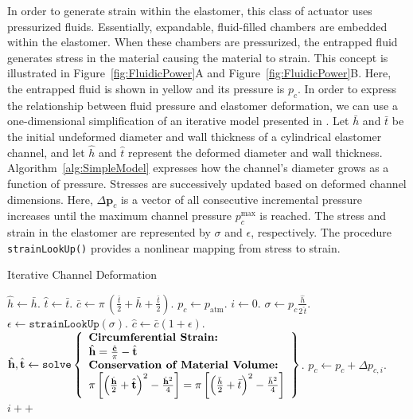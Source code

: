 In order to generate strain within the elastomer, this class of actuator uses pressurized fluids.
Essentially, expandable, fluid-filled chambers are embedded within the elastomer.
When these chambers are pressurized, the entrapped fluid generates stress in the material causing the material to strain.
This concept is illustrated in Figure~\ref{fig:FluidicPower}A and Figure~\ref{fig:FluidicPower}B.
Here, the entrapped fluid is shown in yellow and its pressure is $p_c$.
In order to express the relationship between fluid pressure and elastomer deformation, we can use a one-dimensional simplification of an iterative model presented in \citet{marchese2015design}.
Let $\bar{h}$ and $\bar{t}$ be the initial undeformed diameter and wall thickness of a cylindrical elastomer channel, and let $\hat{h}$ and $\hat{t}$ represent the deformed diameter and wall thickness.
Algorithm~\ref{alg:SimpleModel} expresses how the channel's diameter grows as a function of pressure.
Stresses are successively updated based on deformed channel dimensions.
Here, $\Delta \mathbf{p}_{c}$ is a vector of all consecutive incremental pressure increases until the maximum channel pressure $p_c^{\text{max}}$ is reached.
The stress and strain in the elastomer are represented by $\sigma$ and $\epsilon$, respectively.
The procedure \texttt{strainLookUp()} provides a nonlinear mapping from stress to strain.
\begin{algorithm}[htb]
\footnotesize
  \DontPrintSemicolon
  \SetAlgoLined
  \caption{Iterative Channel Deformation}
  \label{alg:SimpleModel}
  $\hat{h} \gets \bar{h}$. \;
  $\hat{t} \gets \bar{t}$. \;
  $\bar{c} \gets \pi \, \left(\frac{\bar{t}}{2} + \bar{h} + \frac{\bar{t}}{2}\right)$. \;
  $p_c \gets p_{\text{atm}}$. \;
  $i \gets 0$. \;
  {
     $\sigma \gets p_c \frac{\hat{h}}{2 \,\hat{t}}$. \;
     $\epsilon \gets \texttt{strainLookUp}(\sigma)$. \;
     $\hat{c} \gets \bar{c}\left( 1 + \epsilon \right)$. \;
     $\hat{h}, \hat{t} \gets \texttt{solve}\left\{
	\begin{array}{l}
       \text{\textbf{Circumferential Strain:}} \\
       \hat{h} = \frac{\hat{c}}{\pi} - \hat{t} \\
       \text{\textbf{Conservation of Material Volume:}} \\
       \pi \left[ \left( \frac{\hat{h}}{2} + \hat{t}\right)^2 - \frac{\hat{h}^2}{4} \right]= \pi \left[\left( \frac{\bar{h}}{2} + \bar{t}\right)^2 - \frac{\bar{h}^2}{4}\right]
     \end{array}
     \right\} $. \;
     $p_c \gets p_c + \Delta p_{c,i}$. \;
     $i++$
   }
\normalsize
\end{algorithm}

